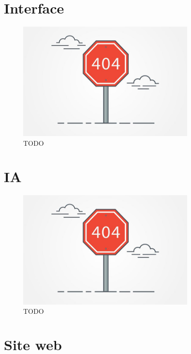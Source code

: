 \documentclass[12pt]{report}
\begin{document}
\section*{Interface}

\begin{figure}[H]
    \centering
    \includegraphics[width=0.8\textwidth]{404}
    \caption{TODO}
\end{figure}

\section*{IA}

\begin{figure}[H]
    \centering
    \includegraphics[width=0.8\textwidth]{404}
    \caption{TODO}
\end{figure}

\section*{Site web}
\end{document}
